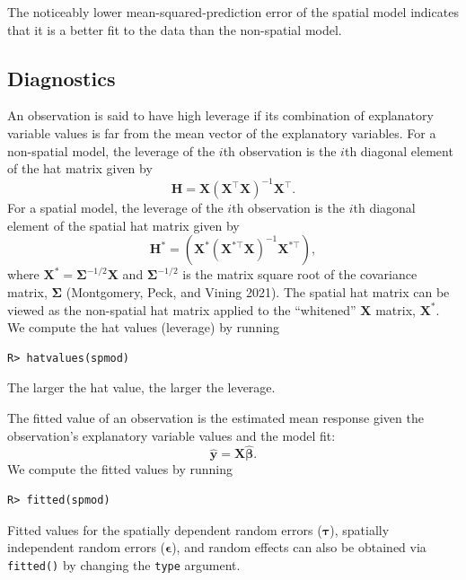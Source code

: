 \documentclass{article}
\begin{document}
The noticeably lower mean-squared-prediction error of the spatial model
indicates that it is a better fit to the data than the non-spatial
model.

\hypertarget{diagnostics}{%
\subsection{Diagnostics}\label{diagnostics}}

An observation is said to have high leverage if its combination of
explanatory variable values is far from the mean vector of the
explanatory variables. For a non-spatial model, the leverage of the
\(i\)th observation is the \(i\)th diagonal element of the hat matrix
given by \begin{equation*}
  \mathbf{H} = \mathbf{X}(\mathbf{X}^\top\mathbf{X})^{-1}\mathbf{X}^\top .
\end{equation*} For a spatial model, the leverage of the \(i\)th
observation is the \(i\)th diagonal element of the spatial hat matrix
given by \begin{equation*}
  \mathbf{H}^* = (\mathbf{X}^* (\mathbf{X}^{* \top} \mathbf{X})^{-1} \mathbf{X}^{* \top}) ,
\end{equation*} where
\(\mathbf{X}^* = \boldsymbol{\Sigma}^{-1/2}\mathbf{X}\) and
\(\boldsymbol{\Sigma}^{-1/2}\) is the matrix square root of the
covariance matrix, \(\boldsymbol{\Sigma}\) (Montgomery, Peck, and Vining
2021). The spatial hat matrix can be viewed as the non-spatial hat
matrix applied to the ``whitened'' \(\mathbf{X}\) matrix,
\(\mathbf{X}^*\). We compute the hat values (leverage) by running

\begin{verbatim}
R> hatvalues(spmod)
\end{verbatim}

The larger the hat value, the larger the leverage.

The fitted value of an observation is the estimated mean response given
the observation's explanatory variable values and the model fit:
\begin{equation*}
  \hat{\mathbf{y}} = \mathbf{X} \hat{\boldsymbol{\beta}}.
\end{equation*} We compute the fitted values by running

\begin{verbatim}
R> fitted(spmod)
\end{verbatim}

Fitted values for the spatially dependent random errors
(\(\boldsymbol{\tau}\)), spatially independent random errors
(\(\boldsymbol{\epsilon}\)), and random effects can also be obtained via
\texttt{fitted()} by changing the \texttt{type} argument.
\end{document}
